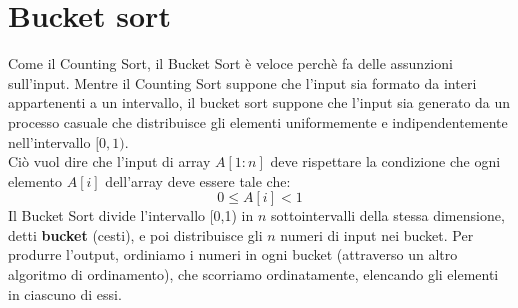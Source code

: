 \section{Bucket sort}
Come il Counting Sort, il Bucket Sort è veloce perchè fa delle assunzioni sull'input. Mentre il Counting Sort suppone che l'input sia formato da interi appartenenti a un intervallo, il bucket sort suppone che l'input sia generato da un processo casuale che distribuisce gli elementi uniformemente e indipendentemente nell'intervallo $[0,1)$.\\
Ciò vuol dire che l'input di array $A[1:n]$ deve rispettare la condizione che ogni elemento $A[i]$ dell'array deve essere tale che:
$$0\le A[i] <1$$
Il Bucket Sort divide l'intervallo [0,1) in $n$ sottointervalli della stessa dimensione, detti \textbf{bucket} (cesti), e poi distribuisce gli $n$ numeri di input nei bucket. Per produrre l'output, ordiniamo i numeri in ogni bucket (attraverso un altro algoritmo di ordinamento), che scorriamo ordinatamente, elencando gli elementi in ciascuno di essi.\smallskip\\
